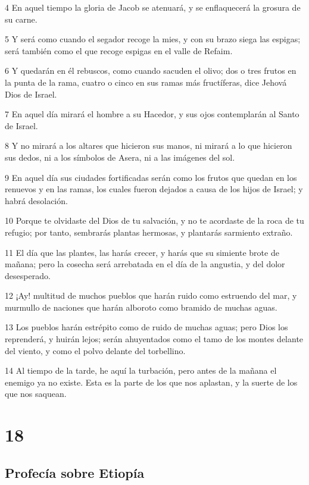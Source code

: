 \par 4 En aquel tiempo la gloria de Jacob se atenuará, y se enflaquecerá la grosura de su carne.
\par 5 Y será como cuando el segador recoge la mies, y con su brazo siega las espigas; será también como el que recoge espigas en el valle de Refaim.
\par 6 Y quedarán en él rebuscos, como cuando sacuden el olivo; dos o tres frutos en la punta de la rama, cuatro o cinco en sus ramas más fructíferas, dice Jehová Dios de Israel.
\par 7 En aquel día mirará el hombre a su Hacedor, y sus ojos contemplarán al Santo de Israel.
\par 8 Y no mirará a los altares que hicieron sus manos, ni mirará a lo que hicieron sus dedos, ni a los símbolos de Asera, ni a las imágenes del sol.
\par 9 En aquel día sus ciudades fortificadas serán como los frutos que quedan en los renuevos y en las ramas, los cuales fueron dejados a causa de los hijos de Israel; y habrá desolación.
\par 10 Porque te olvidaste del Dios de tu salvación, y no te acordaste de la roca de tu refugio; por tanto, sembrarás plantas hermosas, y plantarás sarmiento extraño.
\par 11 El día que las plantes, las harás crecer, y harás que su simiente brote de mañana; pero la cosecha será arrebatada en el día de la angustia, y del dolor desesperado.
\par 12 ¡Ay! multitud de muchos pueblos que harán ruido como estruendo del mar, y murmullo de naciones que harán alboroto como bramido de muchas aguas.
\par 13 Los pueblos harán estrépito como de ruido de muchas aguas; pero Dios los reprenderá, y huirán lejos; serán ahuyentados como el tamo de los montes delante del viento, y como el polvo delante del torbellino.
\par 14 Al tiempo de la tarde, he aquí la turbación, pero antes de la mañana el enemigo ya no existe. Esta es la parte de los que nos aplastan, y la suerte de los que nos saquean.

\chapter{18}

\section*{Profecía sobre Etiopía}

